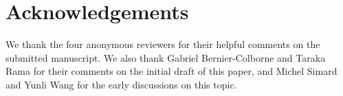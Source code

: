 \documentclass[11pt]{article}
\begin{document}
\section*{Acknowledgements} We thank the four anonymous reviewers for their helpful comments on the submitted manuscript. We also thank Gabriel Bernier-Colborne and Taraka Rama for their comments on the initial draft of this paper, and Michel Simard and Yunli Wang for the early discussions on this topic.




\appendix
\end{document}
